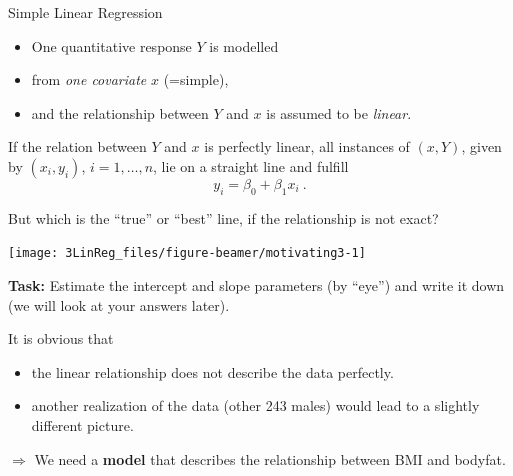 \documentclass[10pt,ignorenonframetext,]{beamer}
\providecommand{\tightlist}{%
  \setlength{\itemsep}{0pt}\setlength{\parskip}{0pt}}
\begin{document}
\begin{frame}{Simple Linear Regression}

\begin{itemize}
\item
  One quantitative response \(Y\) is modelled
\item
  from \emph{one covariate} \(x\) (=simple),
\item
  and the relationship between \(Y\) and \(x\) is assumed to be
  \emph{linear}.
\end{itemize}

\vspace{6mm} If the relation between \(Y\) and \(x\) is perfectly
linear, all instances of \((x,Y)\), given by \((x_i,y_i)\),
\(i= 1,\ldots, n\), lie on a straight line and fulfill
\[y_i = \beta_0 + \beta_1 x_i\ .\]

\end{frame}

\begin{frame}

But which is the ``true'' or ``best'' line, if the relationship is not
exact?

\begin{center}\texttt{[image: 3LinReg\_files/figure-beamer/motivating3-1]} \end{center}

\textbf{Task:} Estimate the intercept and slope parameters (by ``eye'')
and write it down (we will look at your answers later).

\end{frame}

\begin{frame}

It is obvious that

\begin{itemize}
\tightlist
\item
  the linear relationship does not describe the data perfectly.
\item
  another realization of the data (other 243 males) would lead to a
  slightly different picture.
\end{itemize}

\vspace{4mm} \(\Rightarrow\) We need a \textbf{model} that describes the
relationship between BMI and bodyfat.

\end{frame}
\end{document}
